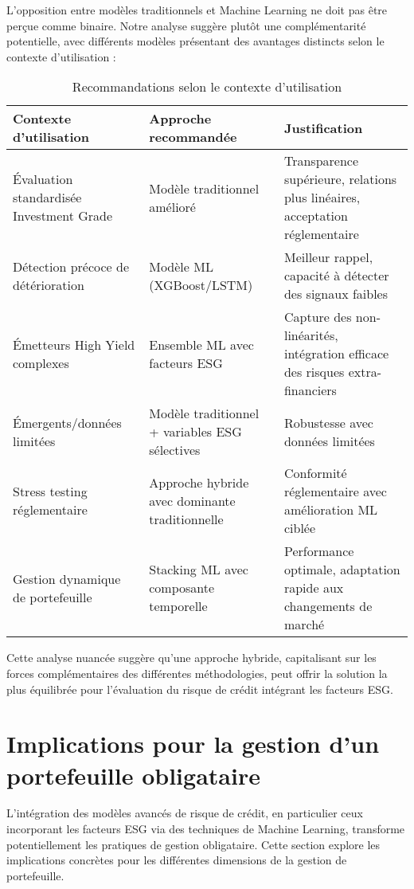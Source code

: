 L'opposition entre modèles traditionnels et Machine Learning ne doit pas être perçue comme binaire. Notre analyse suggère plutôt une complémentarité potentielle, avec différents modèles présentant des avantages distincts selon le contexte d'utilisation :

\begin{table}[htbp]
  \centering
  \caption{Recommandations selon le contexte d'utilisation}
  \begin{tabular}{lll}
    \toprule
    \textbf{Contexte d'utilisation} & \textbf{Approche recommandée} & \textbf{Justification} \\
    \midrule
    Évaluation standardisée Investment Grade & Modèle traditionnel amélioré & Transparence supérieure, relations plus linéaires, acceptation réglementaire \\
    Détection précoce de détérioration & Modèle ML (XGBoost/LSTM) & Meilleur rappel, capacité à détecter des signaux faibles \\
    Émetteurs High Yield complexes & Ensemble ML avec facteurs ESG & Capture des non-linéarités, intégration efficace des risques extra-financiers \\
    Émergents/données limitées & Modèle traditionnel + variables ESG sélectives & Robustesse avec données limitées \\
    Stress testing réglementaire & Approche hybride avec dominante traditionnelle & Conformité réglementaire avec amélioration ML ciblée \\
    Gestion dynamique de portefeuille & Stacking ML avec composante temporelle & Performance optimale, adaptation rapide aux changements de marché \\
    \bottomrule
  \end{tabular}
\end{table}

Cette analyse nuancée suggère qu'une approche hybride, capitalisant sur les forces complémentaires des différentes méthodologies, peut offrir la solution la plus équilibrée pour l'évaluation du risque de crédit intégrant les facteurs ESG.

\section{Implications pour la gestion d'un portefeuille obligataire}

L'intégration des modèles avancés de risque de crédit, en particulier ceux incorporant les facteurs ESG via des techniques de Machine Learning, transforme potentiellement les pratiques de gestion obligataire. Cette section explore les implications concrètes pour les différentes dimensions de la gestion de portefeuille.

